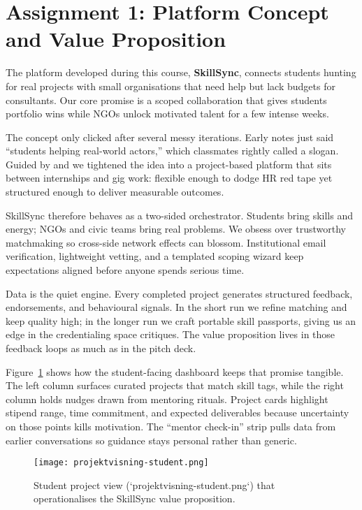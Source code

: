 \section*{Assignment 1: Platform Concept and Value Proposition}

The platform developed during this course, \textbf{SkillSync}, connects students hunting for real projects with small organisations that need help but lack budgets for consultants. Our core promise is a scoped collaboration that gives students portfolio wins while NGOs unlock motivated talent for a few intense weeks.

The concept only clicked after several messy iterations. Early notes just said ``students helping real-world actors,'' which classmates rightly called a slogan. Guided by \citet{Choudary2016} and \citet{Srnicek2017} we tightened the idea into a project-based platform that sits between internships and gig work: flexible enough to dodge HR red tape yet structured enough to deliver measurable outcomes.

SkillSync therefore behaves as a two-sided orchestrator. Students bring skills and energy; NGOs and civic teams bring real problems. We obsess over trustworthy matchmaking so cross-side network effects can blossom. Institutional email verification, lightweight vetting, and a templated scoping wizard keep expectations aligned before anyone spends serious time.

Data is the quiet engine. Every completed project generates structured feedback, endorsements, and behavioural signals. In the short run we refine matching and keep quality high; in the longer run we craft portable skill passports, giving us an edge in the credentialing space \citet{Zuboff2019} critiques. The value proposition lives in those feedback loops as much as in the pitch deck.

Figure~\ref{fig:student-view} shows how the student-facing dashboard keeps that promise tangible. The left column surfaces curated projects that match skill tags, while the right column holds nudges drawn from mentoring rituals. Project cards highlight stipend range, time commitment, and expected deliverables because uncertainty on those points kills motivation. The ``mentor check-in'' strip pulls data from earlier conversations so guidance stays personal rather than generic.

\begin{figure}[h]
  \centering
  \texttt{[image: projektvisning-student.png]}
  \caption{Student project view (`projektvisning-student.png`) that operationalises the SkillSync value proposition.}
  \label{fig:student-view}
\end{figure}

